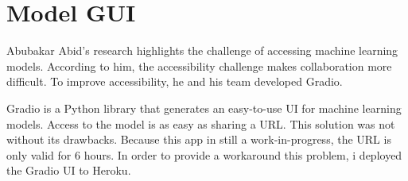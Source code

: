\section{Model GUI}

Abubakar Abid's \cite{abid2019gradio} research highlights the challenge of accessing machine learning models. According to him, the accessibility challenge makes collaboration more difficult. To improve accessibility, he and his team developed Gradio.

Gradio is a Python library that generates an easy-to-use UI for machine learning models. Access to the model is as easy as sharing a URL. This solution was not without its drawbacks. Because this app in still a work-in-progress, the URL is only valid for 6 hours. In order to provide a workaround this problem, i deployed the Gradio UI to Heroku. 